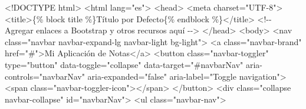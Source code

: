 \documentclass[
  a4paper,
  DIV=11,
  numbers=noendperiod,
  onepage,
  openany]{scrreprt}
\newenvironment{Shaded}{\begin{snugshade}}{\end{snugshade}}
\newcommand{\CommentTok}[1]{\textcolor[rgb]{0.37,0.37,0.37}{#1}}
\newcommand{\DataTypeTok}[1]{\textcolor[rgb]{0.68,0.00,0.00}{#1}}
\newcommand{\KeywordTok}[1]{\textcolor[rgb]{0.00,0.23,0.31}{#1}}
\newcommand{\NormalTok}[1]{\textcolor[rgb]{0.00,0.23,0.31}{#1}}
\newcommand{\OperatorTok}[1]{\textcolor[rgb]{0.37,0.37,0.37}{#1}}
\newcommand{\OtherTok}[1]{\textcolor[rgb]{0.00,0.23,0.31}{#1}}
\newcommand{\StringTok}[1]{\textcolor[rgb]{0.13,0.47,0.30}{#1}}
\begin{document}
\begin{Shaded}
\begin{Highlighting}[]

\DataTypeTok{\textless{}!DOCTYPE }\NormalTok{html}\DataTypeTok{\textgreater{}}
\DataTypeTok{\textless{}}\KeywordTok{html}\OtherTok{ lang}\OperatorTok{=}\StringTok{"es"}\DataTypeTok{\textgreater{}}
\DataTypeTok{\textless{}}\KeywordTok{head}\DataTypeTok{\textgreater{}}
    \DataTypeTok{\textless{}}\KeywordTok{meta}\OtherTok{ charset}\OperatorTok{=}\StringTok{"UTF{-}8"}\DataTypeTok{\textgreater{}}
    \DataTypeTok{\textless{}}\KeywordTok{title}\DataTypeTok{\textgreater{}}\NormalTok{\{\% block title \%\}Título por Defecto\{\% endblock \%\}}\DataTypeTok{\textless{}/}\KeywordTok{title}\DataTypeTok{\textgreater{}}
    \CommentTok{\textless{}!{-}{-} Agregar enlaces a Bootstrap y otros recursos aquí {-}{-}\textgreater{}}
\DataTypeTok{\textless{}/}\KeywordTok{head}\DataTypeTok{\textgreater{}}
\DataTypeTok{\textless{}}\KeywordTok{body}\DataTypeTok{\textgreater{}}
    \DataTypeTok{\textless{}}\KeywordTok{nav}\OtherTok{ class}\OperatorTok{=}\StringTok{"navbar navbar{-}expand{-}lg navbar{-}light bg{-}light"}\DataTypeTok{\textgreater{}}
        \DataTypeTok{\textless{}}\KeywordTok{a}\OtherTok{ class}\OperatorTok{=}\StringTok{"navbar{-}brand"}\OtherTok{ href}\OperatorTok{=}\StringTok{"\#"}\DataTypeTok{\textgreater{}}\NormalTok{Mi Aplicación de Notas}\DataTypeTok{\textless{}/}\KeywordTok{a}\DataTypeTok{\textgreater{}}
        \DataTypeTok{\textless{}}\KeywordTok{button}\OtherTok{ class}\OperatorTok{=}\StringTok{"navbar{-}toggler"}\OtherTok{ type}\OperatorTok{=}\StringTok{"button"}\OtherTok{ data{-}toggle}\OperatorTok{=}\StringTok{"collapse"}\OtherTok{ data{-}target}\OperatorTok{=}\StringTok{"\#navbarNav"}\OtherTok{ aria{-}controls}\OperatorTok{=}\StringTok{"navbarNav"}\OtherTok{ aria{-}expanded}\OperatorTok{=}\StringTok{"false"}\OtherTok{ aria{-}label}\OperatorTok{=}\StringTok{"Toggle navigation"}\DataTypeTok{\textgreater{}}
            \DataTypeTok{\textless{}}\KeywordTok{span}\OtherTok{ class}\OperatorTok{=}\StringTok{"navbar{-}toggler{-}icon"}\DataTypeTok{\textgreater{}\textless{}/}\KeywordTok{span}\DataTypeTok{\textgreater{}}
        \DataTypeTok{\textless{}/}\KeywordTok{button}\DataTypeTok{\textgreater{}}
        \DataTypeTok{\textless{}}\KeywordTok{div}\OtherTok{ class}\OperatorTok{=}\StringTok{"collapse navbar{-}collapse"}\OtherTok{ id}\OperatorTok{=}\StringTok{"navbarNav"}\DataTypeTok{\textgreater{}}
            \DataTypeTok{\textless{}}\KeywordTok{ul}\OtherTok{ class}\OperatorTok{=}\StringTok{"navbar{-}nav"}\DataTypeTok{\textgreater{}}

\end{Highlighting}
\end{Shaded}
\end{document}
